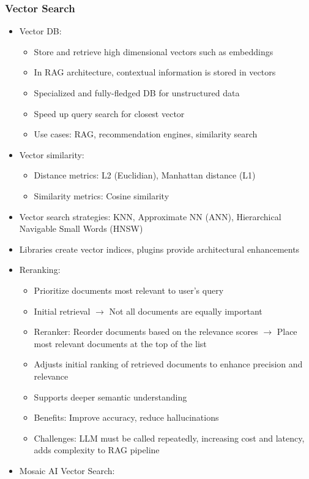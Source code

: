 \documentclass[11pt]{scrartcl}
\begin{document}
\subsubsection*{Vector Search}
\begin{itemize}
	\item Vector DB:
	\begin{itemize}
		\item Store and retrieve high dimensional vectors such as embeddings
		\item In RAG architecture, contextual information is stored in vectors
		\item Specialized and fully-fledged DB for unstructured data
		\item Speed up query search for closest vector
		\item Use cases: RAG, recommendation engines, similarity search
	\end{itemize}
	\item Vector similarity: 
	\begin{itemize}
		\item Distance metrics: L2 (Euclidian), Manhattan distance (L1)
		\item Similarity metrics: Cosine similarity
	\end{itemize}
	\item Vector search strategies: KNN, Approximate NN (ANN), Hierarchical Navigable Small Words (HNSW)
	\item Libraries create vector indices, plugins provide architectural enhancements
	\item Reranking:
	\begin{itemize}
		\item Prioritize documents most relevant to user's query
		\item Initial retrieval $\to$ Not all documents are equally important
		\item Reranker: Reorder documents based on the relevance scores $\to$ Place most relevant documents at the top of the list
		\item Adjusts initial ranking of retrieved documents to enhance precision and relevance
		\item Supports deeper semantic understanding
		\item Benefits: Improve accuracy, reduce hallucinations
		\item Challenges: LLM must be called repeatedly, increasing cost and latency, adds complexity to RAG pipeline
	\end{itemize}
	\item Mosaic AI Vector Search:

\end{itemize}
\end{document}
